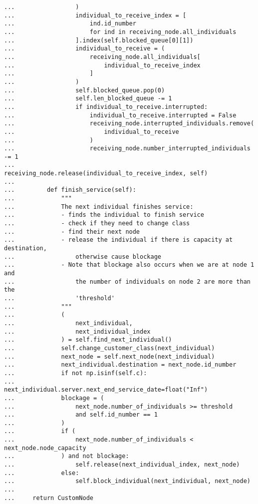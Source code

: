 \begin{lstlisting}[style=pystyle]
...                 )
...                 individual_to_receive_index = [
...                     ind.id_number
...                     for ind in receiving_node.all_individuals
...                 ].index(self.blocked_queue[0][1])
...                 individual_to_receive = (
...                     receiving_node.all_individuals[
...                         individual_to_receive_index
...                     ]
...                 )
...                 self.blocked_queue.pop(0)
...                 self.len_blocked_queue -= 1
...                 if individual_to_receive.interrupted:
...                     individual_to_receive.interrupted = False
...                     receiving_node.interrupted_individuals.remove(
...                         individual_to_receive
...                     )
...                     receiving_node.number_interrupted_individuals -= 1
...                 receiving_node.release(individual_to_receive_index, self)
...
...         def finish_service(self):
...             """
...             The next individual finishes service:
...             - finds the individual to finish service
...             - check if they need to change class
...             - find their next node
...             - release the individual if there is capacity at destination,
...                 otherwise cause blockage
...             - Note that blockage also occurs when we are at node 1 and
...                 the number of individuals on node 2 are more than the
...                 'threshold'
...             """
...             (
...                 next_individual,
...                 next_individual_index
...             ) = self.find_next_individual()
...             self.change_customer_class(next_individual)
...             next_node = self.next_node(next_individual)
...             next_individual.destination = next_node.id_number
...             if not np.isinf(self.c):
...                 next_individual.server.next_end_service_date=float("Inf")
...             blockage = (
...                 next_node.number_of_individuals >= threshold
...                 and self.id_number == 1
...             )
...             if (
...                 next_node.number_of_individuals < next_node.node_capacity
...             ) and not blockage:
...                 self.release(next_individual_index, next_node)
...             else:
...                 self.block_individual(next_individual, next_node)
...
...     return CustomNode
\end{lstlisting}

